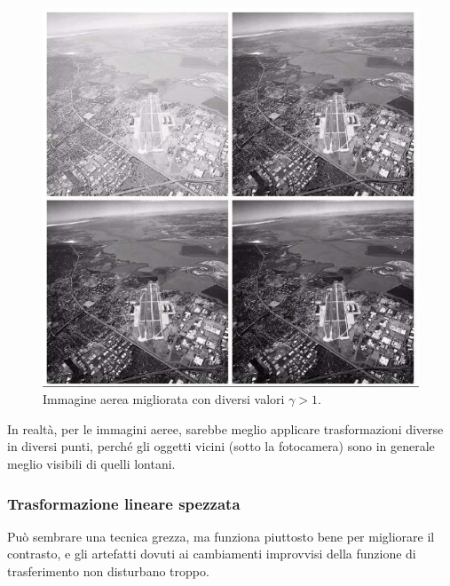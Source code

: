 \documentclass[a4paper,11pt]{article}
\begin{document}
\renewcommand{\thefigure}{5.11}
\begin{figure}[!h]
  \centering
    \includegraphics[scale=0.5]{images/5/aerial_gamma.png}
    \caption{Immagine aerea migliorata con diversi valori $\gamma > 1$.}
\end{figure}

In realtà, per le immagini aeree, sarebbe meglio applicare trasformazioni diverse in diversi punti, perché gli oggetti vicini (sotto la fotocamera) sono in generale
meglio visibili di quelli lontani.
\newpage

\subsubsection{Trasformazione lineare spezzata}
Può sembrare una tecnica grezza, ma funziona piuttosto bene per migliorare il contrasto, e gli artefatti dovuti ai cambiamenti improvvisi della funzione di trasferimento non disturbano troppo.
\end{document}
